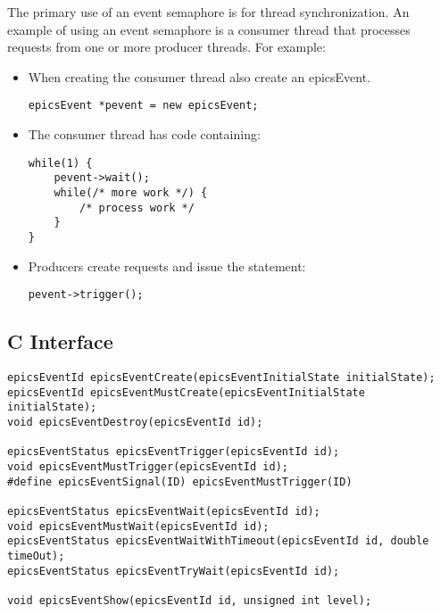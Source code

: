 The primary use of an event semaphore is for thread synchronization.
An example of using an event semaphore is a consumer thread that processes requests from one or more producer threads.
For example:

\begin{itemize}
\item When creating the consumer thread also create an epicsEvent.

\begin{verbatim}
epicsEvent *pevent = new epicsEvent;
\end{verbatim}

\item The consumer thread has code containing:

\begin{verbatim}
while(1) {
    pevent->wait();
    while(/* more work */) {
        /* process work */
    }
}
\end{verbatim}

\item Producers create requests and issue the statement:

\begin{verbatim}
pevent->trigger();
\end{verbatim}

\end{itemize}

\subsection{C Interface}

\begin{verbatim}
epicsEventId epicsEventCreate(epicsEventInitialState initialState);
epicsEventId epicsEventMustCreate(epicsEventInitialState initialState);
void epicsEventDestroy(epicsEventId id);

epicsEventStatus epicsEventTrigger(epicsEventId id);
void epicsEventMustTrigger(epicsEventId id);
#define epicsEventSignal(ID) epicsEventMustTrigger(ID)

epicsEventStatus epicsEventWait(epicsEventId id);
void epicsEventMustWait(epicsEventId id);
epicsEventStatus epicsEventWaitWithTimeout(epicsEventId id, double timeOut);
epicsEventStatus epicsEventTryWait(epicsEventId id);

void epicsEventShow(epicsEventId id, unsigned int level);
\end{verbatim}

